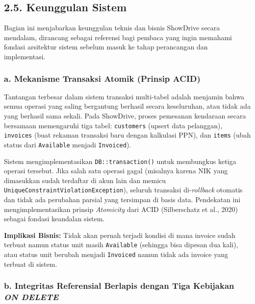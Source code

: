 \documentclass[11pt, a5paper]{article}
\begin{document}
\subsection*{2.5. Keunggulan Sistem}

Bagian ini menjabarkan keunggulan teknis dan bisnis ShowDrive secara mendalam,
dirancang sebagai referensi bagi pembaca yang ingin memahami fondasi arsitektur
sistem sebelum masuk ke tahap perancangan dan implementasi.

\subsubsection*{a. Mekanisme Transaksi Atomik (Prinsip ACID)}

Tantangan terbesar dalam sistem transaksi multi-tabel adalah menjamin bahwa
semua operasi yang saling bergantung berhasil secara keseluruhan, atau tidak ada
yang berhasil sama sekali. Pada ShowDrive, proses pemesanan kendaraan secara
bersamaan memengaruhi tiga tabel: \texttt{customers} (upsert data pelanggan),
\texttt{invoices} (buat rekaman transaksi baru dengan kalkulasi PPN), dan
\texttt{items} (ubah status dari \texttt{Available} menjadi \texttt{Invoiced}).

Sistem mengimplementasikan \texttt{DB::transaction()} untuk membungkus ketiga
operasi tersebut. Jika salah satu operasi gagal (misalnya karena NIK yang
dimasukkan sudah terdaftar di akun lain dan memicu
\texttt{UniqueConstraintViolationException}), seluruh transaksi di-\textit{rollback}
otomatis dan tidak ada perubahan parsial yang tersimpan di basis data. Pendekatan
ini mengimplementasikan prinsip \textit{Atomicity} dari ACID
(Silberschatz et al., 2020) sebagai fondasi keandalan sistem.

\begin{infobox}
\textbf{Implikasi Bisnis:} Tidak akan pernah terjadi kondisi di mana invoice
sudah terbuat namun status unit masih \texttt{Available} (sehingga bisa dipesan
dua kali), atau status unit berubah menjadi \texttt{Invoiced} namun tidak ada
invoice yang terbuat di sistem.
\end{infobox}

\subsubsection*{b. Integritas Referensial Berlapis dengan Tiga Kebijakan
\textit{ON DELETE}}
\end{document}
